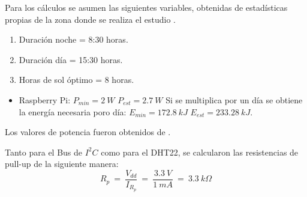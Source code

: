 
Para los cálculos se asumen las siguientes variables, obtenidas de estadísticas propias de la zona donde se realiza el estudio .
\begin{enumerate}
	\item Duración noche = 8:30 horas.
	\item Duración día = 15:30 horas.
	\item Horas de sol  óptimo = 8 horas.
\end{enumerate}

\begin{itemize}
	\item Raspberry Pi: $P_{min} = 2 \ W$ $P_{est} = 2.7 \ W$ Si se multiplica por un  día se obtiene la energía necesaria poro día: $E_{min} = 172.8 \ kJ$ $E_{est} = 233.28 \ kJ$.
\end{itemize}

Los valores de potencia fueron obtenidos de .


Tanto para el Bus de $I^2C$ como para el DHT22, se calcularon las resistencias de pull-up de la siguiente manera:
\begin{equation}
	R_p \ = \  \frac{V_{dd}}{I_{R_p}} \ = \ \frac{3.3 \ V}{1 \ mA} \ = \ 3.3 \ k\Omega  
\end{equation}

